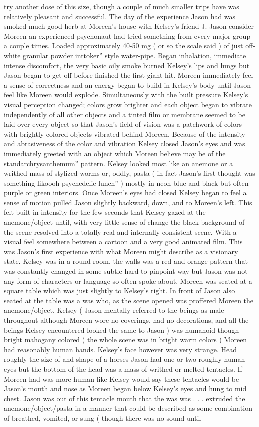 \documentclass[12pt]{book}
\begin{document}
try another dose of this size, though a couple of much smaller trips have was relatively pleasant and successful. The day of the experience Jason had was smoked much good herb at Moreen's house with Kelsey's friend J. Jason consider Moreen an experienced psychonaut had tried something from every major group a couple times. Loaded approximately 40-50 mg ( or so the scale said ) of just off-white granular powder inttoker'' style water-pipe. Began inhalation, immediate intense discomfort, the very basic oily smoke burned Kelsey's lips and lungs but Jason began to get off before finished the first giant hit. Moreen immediately feel a sense of correctness and an energy began to build in Kelsey's body until Jason feel like Moreen would explode. Simultaneously with the built pressure Kelsey's visual perception changed; colors grow brighter and each object began to vibrate independently of all other objects and a tinted film or membrane seemed to be laid over every object so that Jason's field of vision was a patchwork of colors with brightly colored objects vibrated behind Moreen. Because of the intensity and abrasiveness of the color and vibration Kelsey closed Jason's eyes and was immediately greeted with an object which Moreen believe may be of the standarchrysanthemum'' pattern. Kelsey looked most like an anemone or a writhed mass of stylized worms or, oddly, pasta ( in fact Jason's first thought was something likoooh psychedelic lunch'' ) mostly in neon blue and black but often purple or green interiors. Once Moreen's eyes had closed Kelsey began to feel a sense of motion pulled Jason slightly backward, down, and to Moreen's left. This felt built in intensity for the few seconds that Kelsey gazed at the anemone/object until, with very little sense of change the black background of the scene resolved into a totally real and internally consistent scene. With a visual feel somewhere between a cartoon and a very good animated film. This was Jason's first experience with what Moreen might describe as a visionary state. Kelsey was in a round room, the walls was a red and orange pattern that was constantly changed in some subtle hard to pinpoint way but Jason was not any form of characters or language so often spoke about. Moreen was seated at a square table which was just slightly to Kelsey's right. In front of Jason also seated at the table was a was who, as the scene opened was proffered Moreen the anemone/object. Kelsey ( Jason mentally referred to the beings as male throughout although Moreen wore no coverings, had no decorations, and all the beings Kelsey encountered looked the same to Jason ) was humanoid though bright mahogany colored ( the whole scene was in bright warm colors ) Moreen had reasonably human hands. Kelsey's face however was very strange. Head roughly the size of and shape of a horses Jason had one or two roughly human eyes but the bottom of the head was a mass of writhed or melted tentacles. If Moreen had was more human like Kelsey would say these tentacles would be Jason's mouth and nose as Moreen began below Kelsey's eyes and hung to mid chest. Jason was out of this tentacle mouth that the was was . . .  extruded the anemone/object/pasta in a manner that could be described as some combination of breathed, vomited, or sung ( though there was no sound until 
\end{document}
